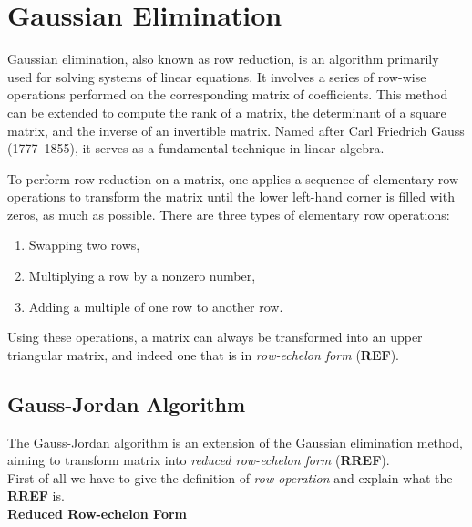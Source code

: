 \section{Gaussian Elimination}
Gaussian elimination, also known as row reduction, is an algorithm primarily used for solving systems of linear equations. It involves a series of row-wise operations performed on the corresponding matrix of coefficients. This method can be extended to compute the rank of a matrix, the determinant of a square matrix, and the inverse of an invertible matrix. Named after Carl Friedrich Gauss (1777–1855), it serves as a fundamental technique in linear algebra.

To perform row reduction on a matrix, one applies a sequence of elementary row operations to transform the matrix until the lower left-hand corner is filled with zeros, as much as possible. There are three types of elementary row operations:

\begin{enumerate}
    \item Swapping two rows,
    \item Multiplying a row by a nonzero number,
    \item Adding a multiple of one row to another row.
\end{enumerate}

Using these operations, a matrix can always be transformed into an upper triangular matrix, and indeed one that is in \textit{row-echelon form} (\textbf{REF}).






\subsection{Gauss-Jordan Algorithm}

The Gauss-Jordan algorithm is an extension of the Gaussian elimination method, aiming to transform matrix into \textit{reduced row-echelon form} (\textbf{RREF}).
\\
First of all we have to give the definition of \textit{row operation} and explain what the \textbf{RREF} is.
\\

\textbf{Reduced Row-echelon Form}

